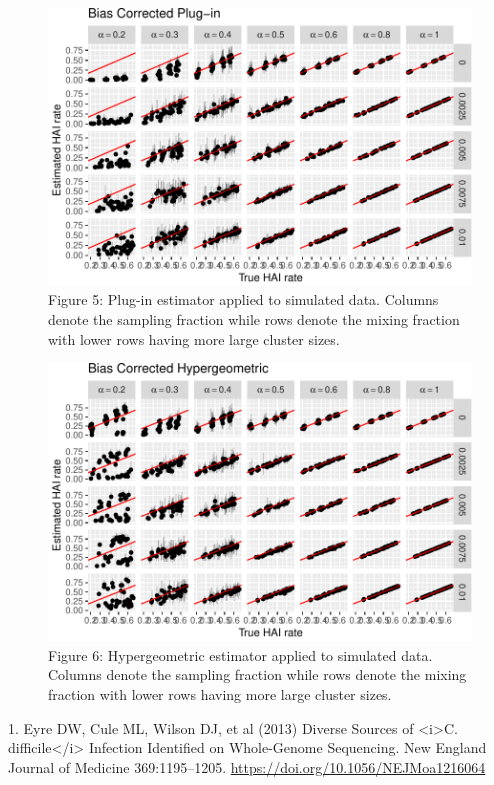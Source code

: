 \documentclass[]{article}
\begin{document}
\begin{figure}
\centering
\includegraphics{Paper_files/figure-latex/fig5-1.pdf}
\caption{\label{fig:fig5}Figure 5: Plug-in estimator applied to
simulated data. Columns denote the sampling fraction while rows denote
the mixing fraction with lower rows having more large cluster sizes.}
\end{figure}

\begin{figure}
\centering
\includegraphics{Paper_files/figure-latex/fig6-1.pdf}
\caption{\label{fig:fig6}Figure 6: Hypergeometric estimator applied to
simulated data. Columns denote the sampling fraction while rows denote
the mixing fraction with lower rows having more large cluster sizes.}
\end{figure}

\hypertarget{refs}{}
\leavevmode\hypertarget{ref-Eyre2013}{}%
1. Eyre DW, Cule ML, Wilson DJ, et al (2013) Diverse Sources of
\textless{}i\textgreater{}C. difficile\textless{}/i\textgreater{}
Infection Identified on Whole-Genome Sequencing. New England Journal of
Medicine 369:1195--1205. \url{https://doi.org/10.1056/NEJMoa1216064}
\end{document}
